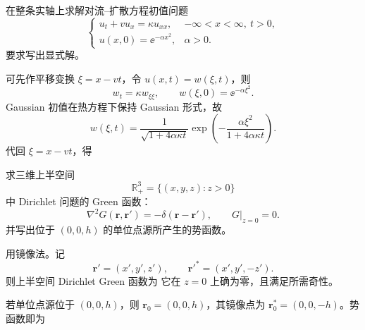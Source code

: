 ﻿


\begin{question}
在整条实轴上求解对流--扩散方程初值问题
\[
\begin{cases}
 u_t+v u_x=\kappa u_{xx}, & -\infty<x<\infty,\ t>0,\\
 u(x,0)=\ee^{-\alpha x^2}, & \alpha>0.
\end{cases}
\]
要求写出显式解。
\begin{solution}

可先作平移变换 $\xi=x-vt$，令 $u(x,t)=w(\xi,t)$，则
\[
 w_t=\kappa w_{\xi\xi},
 \qquad w(\xi,0)=\ee^{-\alpha \xi^2}.
\]
Gaussian 初值在热方程下保持 Gaussian 形式，故
\[
 w(\xi,t)=\frac{1}{\sqrt{1+4\alpha\kappa t}}
 \exp\left(-\frac{\alpha \xi^2}{1+4\alpha\kappa t}\right).
\]
代回 $\xi=x-vt$，得
\end{solution}
\end{question}

\begin{question}
求三维上半空间
\[
\mathbb R_+^3=\{(x,y,z):z>0\}
\]
中 Dirichlet 问题的 Green 函数：
\[
\nabla^2 G(\mathbf r,\mathbf r')=-\delta(\mathbf r-\mathbf r'),
\qquad G|_{z=0}=0.
\]
并写出位于 $(0,0,h)$ 的单位点源所产生的势函数。
\begin{solution}

用镜像法。记
\[
\mathbf r'=(x',y',z'),
\qquad
\mathbf r'^*=(x',y',-z').
\]
则上半空间 Dirichlet Green 函数为
它在 $z=0$ 上确为零，且满足所需奇性。

若单位点源位于 $(0,0,h)$，则 $\mathbf r_0=(0,0,h)$，其镜像点为 $\mathbf r_0^*=(0,0,-h)$。势函数即为
\end{solution}
\end{question}

